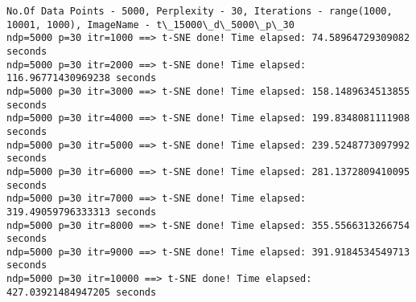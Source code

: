 \documentclass[11pt]{article}
\begin{document}
    \begin{Verbatim}[commandchars=\\\{\}]
No.Of Data Points - 5000, Perplexity - 30, Iterations - range(1000, 10001, 1000), ImageName - t\_15000\_d\_5000\_p\_30
ndp=5000 p=30 itr=1000 ==> t-SNE done! Time elapsed: 74.58964729309082 seconds
ndp=5000 p=30 itr=2000 ==> t-SNE done! Time elapsed: 116.96771430969238 seconds
ndp=5000 p=30 itr=3000 ==> t-SNE done! Time elapsed: 158.1489634513855 seconds
ndp=5000 p=30 itr=4000 ==> t-SNE done! Time elapsed: 199.8348081111908 seconds
ndp=5000 p=30 itr=5000 ==> t-SNE done! Time elapsed: 239.5248773097992 seconds
ndp=5000 p=30 itr=6000 ==> t-SNE done! Time elapsed: 281.1372809410095 seconds
ndp=5000 p=30 itr=7000 ==> t-SNE done! Time elapsed: 319.49059796333313 seconds
ndp=5000 p=30 itr=8000 ==> t-SNE done! Time elapsed: 355.5566313266754 seconds
ndp=5000 p=30 itr=9000 ==> t-SNE done! Time elapsed: 391.9184534549713 seconds
ndp=5000 p=30 itr=10000 ==> t-SNE done! Time elapsed: 427.03921484947205 seconds

    \end{Verbatim}

    \begin{center}
    \end{center}
    { \hspace*{\fill} \\}
    
    \begin{center}
    \end{center}
    { \hspace*{\fill} \\}
    
    \begin{center}
    \end{center}
    { \hspace*{\fill} \\}
    
    \begin{center}
    \end{center}
    { \hspace*{\fill} \\}
    
    \begin{center}
    \end{center}
    { \hspace*{\fill} \\}
    
\end{document}
